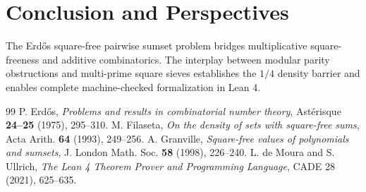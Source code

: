 \documentclass[11pt,a4paper]{article}
\theoremstyle{definition}
\begin{document}
\section{Conclusion and Perspectives}
The Erd\H{o}s square-free pairwise sumset problem bridges multiplicative square-freeness and additive combinatorics. The interplay between modular parity obstructions and multi-prime square sieves establishes the $1/4$ density barrier and enables complete machine-checked formalization in Lean 4.

\begin{thebibliography}{99}
 P. Erd\H{o}s, \textit{Problems and results in combinatorial number theory}, Ast\'erisque \textbf{24--25} (1975), 295--310.
 M. Filaseta, \textit{On the density of sets with square-free sums}, Acta Arith. \textbf{64} (1993), 249--256.
 A. Granville, \textit{Square-free values of polynomials and sumsets}, J. London Math. Soc. \textbf{58} (1998), 226--240.
 L. de Moura and S. Ullrich, \textit{The Lean 4 Theorem Prover and Programming Language}, CADE 28 (2021), 625--635.
\end{thebibliography}
\end{document}
